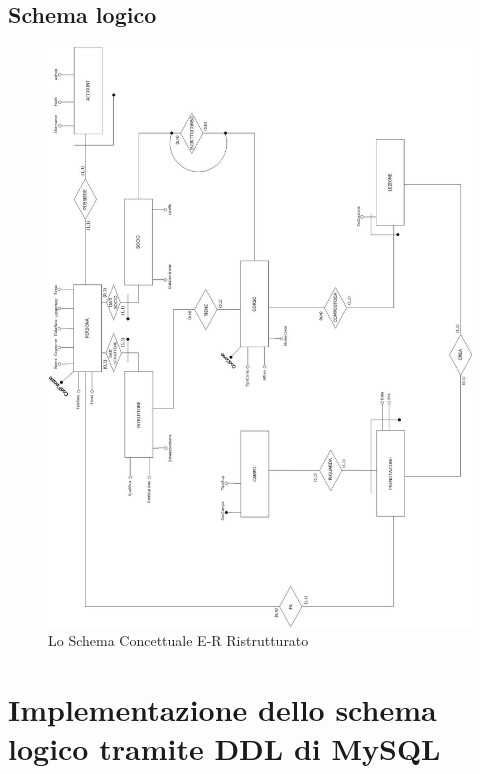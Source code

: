 \section{Schema logico}
\begin{figure}[H]
 \centering
  \includegraphics[width=\textwidth, height=\textheight]{images/LOGICO.jpg}
\caption{Lo Schema Concettuale E-R Ristrutturato}
\end{figure}
\chapter{Implementazione dello schema logico tramite DDL di MySQL} 

